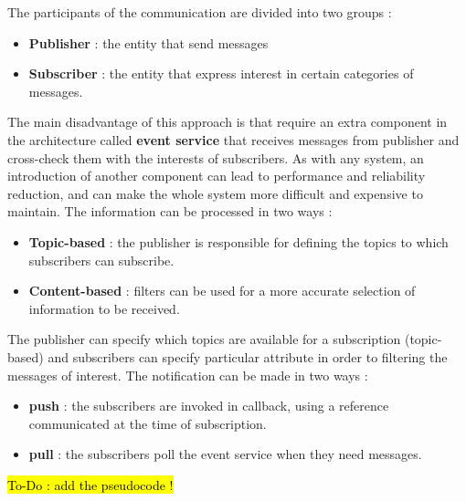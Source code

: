 \begin{center}
\end{center}
The participants of the communication are divided into two groups :
\begin{itemize}
    \item \textbf{Publisher} : the entity that send messages
    \item \textbf{Subscriber} : the entity that express interest in certain categories of messages.
\end{itemize}
The main disadvantage of this approach is that require an extra component in the architecture called \textbf{event service} that receives messages from publisher and cross-check them with the interests of subscribers. As with any system, an introduction of another component can lead to performance and reliability reduction, and can make the whole system more difficult and expensive to maintain. The information can be processed in two ways :
\begin{itemize}
    \item \textbf{Topic-based} : the publisher is responsible for defining the topics to which subscribers can subscribe.
    \item \textbf{Content-based} : filters can be used for a more accurate selection of information to be received.
\end{itemize}
The publisher can specify which topics are available for a subscription (topic-based) and subscribers can specify particular attribute in order to filtering the messages of interest.
The notification can be made in two ways :
\begin{itemize}
    \item \textbf{push} : the subscribers are invoked in callback, using a reference communicated at the time of subscription.
    \item \textbf{pull} : the subscribers poll the event service when they need messages.
\end{itemize}
\hl{To-Do : add the pseudocode !}
